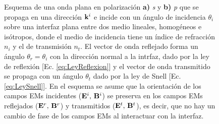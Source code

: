 \begin{figure}[h!]
\begin{subfigure}{.43\textwidth}
	\end{subfigure} 
	\caption{ Esquema de una onda plana en polarización \textbf{a)} \emph{s} y \textbf{b)} \emph{p} que se propaga en una dirección $\vb{k}^i$ e incide con un ángulo de incidencia $\theta_i$ sobre una interfaz plana entre dos medio lineales, homogéneos e isótropos, donde el medio de incidencia tiene un índice de refracción $n_i$ y el de transmisión $n_t$. El vector de onda reflejado forma un ángulo $\theta_r=\theta_i$ con la dirección normal a la intrfaz, dado por la ley de reflexión [Ec. \eqref{eq:LeyReflexion}] y el vector de onda transmitido se propaga con un ángulo $\theta_t$ dado por la ley de Snell [Ec. \eqref{eq:LeySnell}]. En el esquema se asume que la orientación de los campos EMs incidentes  ($\vb{E}^i,\,\vb{B}^i$) se preserva en los campos EMs reflejados ($\vb{E}^r,\,\vb{B}^r$) y transmitidos ($\vb{E}^t,\,\vb{B}^t$), es decir, que no hay un cambio de fase de los campos EMs al interactuar con la interfaz.}	\label{fig:Polarizaciones}	
	\end{figure}	
%

